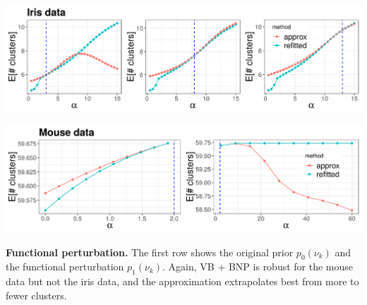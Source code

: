 \documentclass[a0,plainsections,30pt]{sciposter}\usepackage[]{graphicx}\usepackage[]{color}
\newenvironment{knitrout}{}{} %
\begin{document}
\begin{minipage}[t]{0.45\textwidth}
\vspace{0.05in}
%

\begin{knitrout}
\color{fgcolor}

{\centering \includegraphics[width=0.98\linewidth,height=0.294\linewidth]{figure/param_sens_plot-1} 

}



\end{knitrout}

\begin{knitrout}
\color{fgcolor}

{\centering \includegraphics[width=0.98\linewidth,height=0.294\linewidth]{figure/gene_param_sens_plot-1} 

}



\end{knitrout}

\textbf{Functional perturbation.} The first row shows the original prior
$p_0(\nu_k)$ and the functional perturbation $p_1(\nu_k)$.  Again, VB + BNP
is robust for the mouse data but not the iris data, and the approximation
extrapolates best from more to fewer clusters.

\vspace{0.1in}

\begin{knitrout}
\color{fgcolor}


\end{knitrout}
\end{minipage}
\end{document}
